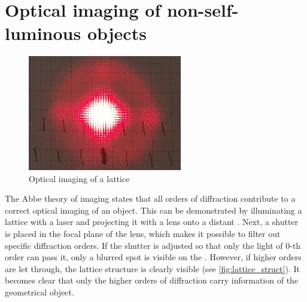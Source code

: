 \chapter{Optical imaging of non-self-luminous objects}
\begin{figure}[htb]
	\centering
	\includegraphics[width=0.6\textwidth]{./img/lattice_struct.jpg}
	\caption[Optical imaging of a lattice]{Optical imaging of a lattice}
	\label{fig:lattice_struct}
\end{figure}

The Abbe theory of imaging states that all orders of diffraction contribute to a correct optical imaging of an object.
This can be demonstrated by illuminating a lattice with a laser and projecting it with a lens onto a distant .
Next, a shutter is placed in the focal plane of the lens, which makes it possible to filter out specific diffraction orders.
If the shutter is adjusted so that only the light of $0$-th order can pass it, only a blurred spot is visible on the .
However, if higher orders are let through, the lattice structure is clearly visible (see \autoref{fig:lattice_struct}).
It becomes clear that only the higher orders of diffraction carry information of the geometrical object.
